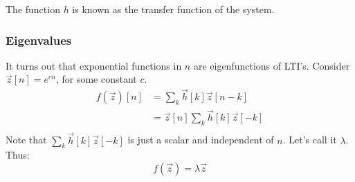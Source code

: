 
The function $h$ is known as the transfer function of the system. 

\subsubsection{Eigenvalues}

It turns out that exponential functions in $n$ are eigenfunctions of LTI's. Consider $\vec{z}[n] = e^{cn}$, for some constant $c$.
\begin{equation}
	\begin{aligned}
		f(\vec{z})[n] 	&= \sum_k \vec{h}[k] \vec{z}[n-k] \\
				&= \vec{z}[n] \sum_k \vec{h}[k] \vec{z}[-k] \\
	\end{aligned}
\end{equation}
Note that $\sum_k \vec{h}[k] \vec{z}[-k]$ is just a scalar and independent of $n$. Let's call it $\lambda$. Thus: 
$$ f(\vec{z}) = \lambda \vec{z} $$

